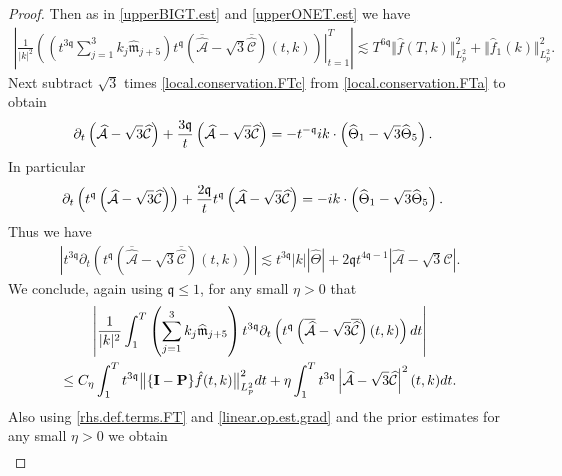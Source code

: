 \documentclass[reqno]{amsart}
\newcommand{\pv}{p}
\def\norm#1{\big\Vert#1\big\Vert}
\newcommand{\qq}{\mathfrak{q}}
\newcommand{\tq}{t^{\qq}}
\newcommand{\tmq}{t^{-\qq}}
\newcommand{\tTq}{t^{3\qq}}
\newcommand{\micro}{{\bf \{I- P\}}}
\newcommand{\highG}{\Theta}
\theoremstyle{definition}
\numberwithin{equation}{section}
\numberwithin{theorem}{section}
\begin{document}
\begin{proof}
Then as in \eqref{upperBIGT.est} and \eqref{upperONET.est} we have 
\begin{align*}
    \left|
\left. \frac{1}{|k|^2} \left(  \left(\tTq\sum_{j=1}^3 k_j    \widehat{\mathfrak{m}}_{j+5} \right)\tq\left( \overline{\widehat{\mathcal{A}}}- \sqrt{3}\overline{\widehat{\mathcal{C}}}\right)(t,k) \right)\right|_{t=1}^T
\right|
\lesssim
 T^{6\qq}\Vert \hat{f}(T,k)\Vert_{L^2_{\pv}}^2
 +
 \norm{ \hat{f}_1(k)}_{L^2_{\pv}}^2.
\end{align*}
Next subtract $\sqrt{3}$ times \eqref{local.conservation.FTc} from  \eqref{local.conservation.FTa} to obtain 
\begin{align}\notag
    \partial_t \left( \widehat{\mathcal{A}}-\sqrt{3}\widehat{\mathcal{C}} \right)
+
\frac{3\qq }{t} \left( \widehat{\mathcal{A}}-\sqrt{3}\widehat{\mathcal{C}} \right)
&=-\tmq ik \cdot \left( \widehat{\highG}_{1}-\sqrt{3}\widehat{\highG}_{5} \right).
\end{align}
In particular 
\begin{align}\notag
    \partial_t \left(\tq\left( \widehat{\mathcal{A}}-\sqrt{3}\widehat{\mathcal{C}} \right)\right)
+
\frac{2\qq }{t} \tq \left( \widehat{\mathcal{A}}-\sqrt{3}\widehat{\mathcal{C}} \right)
&=- ik \cdot \left( \widehat{\highG}_{1}-\sqrt{3}\widehat{\highG}_{5} \right).
\end{align}
Thus we have 
\begin{align*}
  \left|  \tTq \partial_t \left(\tq\left( \overline{\widehat{\mathcal{A}}}- \sqrt{3}\overline{\widehat{\mathcal{C}}}\right)(t,k)\right) \right|
 \lesssim 
\tTq |k| \left| \widehat{\highG}\right|
+
2\qq  t^{4\qq -1}\left|{\widehat{\mathcal{A}}}- \sqrt{3}{\widehat{\mathcal{C}}}\right|.
\end{align*}
We conclude, again using $\qq \leq 1$, for any small $\eta>0$ that 
\begin{multline*}
    \left|
\frac{1}{|k|^2} \int_1^{T} \left( \sum_{j=1}^3 k_j    \widehat{\mathfrak{m}}_{j+5} \right) \tTq\partial_t  \left(\tq\left( \overline{\widehat{\mathcal{A}}}- \sqrt{3}\overline{\widehat{\mathcal{C}}}\right)(t,k)\right) dt
\right|
\\
\leq
C_\eta\int_1^{T} \tTq\norm{\micro \hat{f}(t,k)}_{L^2_{\pv}}^2dt
+
\eta \int^{T}_{1} \tTq \left|{\widehat{\mathcal{A}}}- \sqrt{3}{\widehat{\mathcal{C}}}\right|^2(t,k) dt. 
\end{multline*}
Also using \eqref{rhs.def.terms.FT} and \eqref{linear.op.est.grad} and the prior estimates  for any small $\eta>0$ we obtain 
\begin{multline*}

\end{multline*}
\end{proof}
\end{document}

